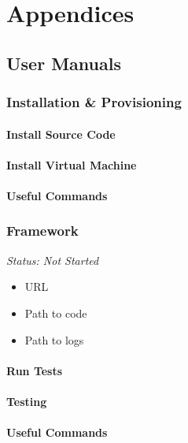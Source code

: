 \chapter*{Appendices}
\renewcommand{\thesection}{\Alph{section}}

\section{User Manuals}

\subsection{Installation \& Provisioning}

\subsubsection{Install Source Code}

\subsubsection{Install Virtual Machine}

\subsubsection{Useful Commands}

\subsection{Framework}

\emph{Status: Not Started}

\begin{itemize}
\item URL
\item Path to code
\item Path to logs
\end{itemize}

\subsubsection{Run Tests}

\subsubsection{Testing}

\subsubsection{Useful Commands}


